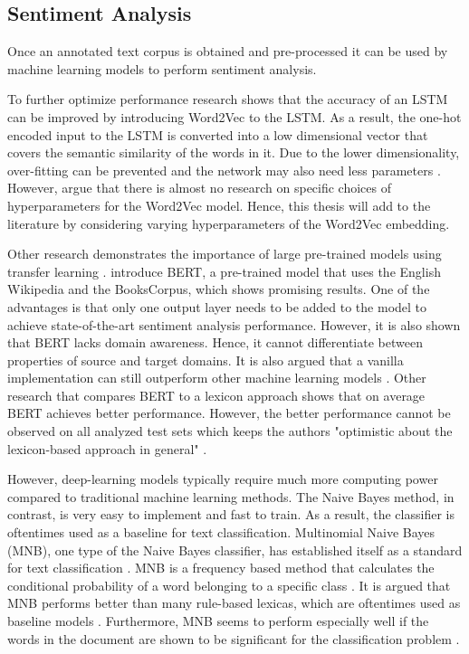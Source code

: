 \documentclass[11pt, a4paper]{article}
\begin{document}
\subsection{Sentiment Analysis}
Once an annotated text corpus is obtained and pre-processed it can be used by machine learning models to perform sentiment analysis.

To further optimize performance research shows that the accuracy of an
LSTM can be improved by introducing Word2Vec to the LSTM. As a result, the one-hot encoded input to the LSTM is
converted into a low dimensional vector that covers the semantic similarity of the words in it. Due to the lower dimensionality,
over-fitting can be prevented and the network may also need less parameters \citep{xiao2018word2veclstm}. However, \cite{giovanni2021word2vec}
argue that there is almost no research on specific choices of hyperparameters for the Word2Vec model. Hence, this thesis will add to the literature
by considering varying hyperparameters of the Word2Vec embedding.

Other research demonstrates the importance of large pre-trained models using transfer learning \citep{deng2009transferlearning}.
\cite{devlin2019bert} introduce BERT, a pre-trained model that uses the English Wikipedia and the BooksCorpus, which shows promising results.
One of the advantages is that only one output layer needs to be added to the model to achieve state-of-the-art sentiment analysis performance.
However, it is also shown that BERT lacks domain awareness. Hence, it cannot differentiate between properties of source and target domains.
It is also argued that a vanilla implementation can still outperform other machine learning models \citep{Du2020AdversarialAD}. Other research that compares BERT to a
lexicon approach shows that on average BERT achieves better performance. However, the better performance cannot be observed on all analyzed test sets
which keeps the authors "optimistic about the lexicon-based approach in general" \citep{kotelnikova2021lexiconbased}. %

However, deep-learning models typically
require much more computing power compared to traditional machine learning methods. The Naive Bayes method, in contrast, is very easy to implement and fast to train. As a
result, the classifier is oftentimes used as a baseline for text classification. Multinomial Naive Bayes (MNB), one type of the Naive Bayes classifier, has established
itself as a standard for text classification \citep{abbas2019mnb}. MNB is a frequency based method that calculates the conditional probability of a word
belonging to a specific class \citep{susanti2017sentiment}. %
It is argued that MNB performs better than many rule-based lexicas, which are oftentimes
used as baseline models \citep{wang2012NB}. Furthermore, MNB seems to perform especially well if the words in the document are shown to be significant for the
classification problem \citep{omar2019conference}.
\end{document}
